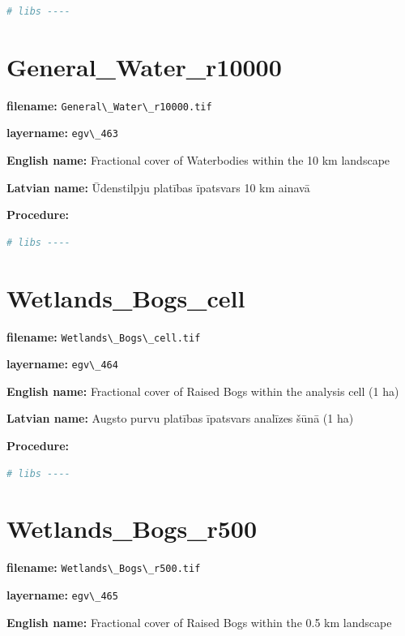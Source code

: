 \documentclass[
]{book}
\newcommand{\passthrough}[1]{#1}
\begin{document}
\begin{lstlisting}[language=R]
# libs ----
\end{lstlisting}

\section{General\_Water\_r10000}\label{ch06.463}

\textbf{filename:} \passthrough{\lstinline!General\_Water\_r10000.tif!}

\textbf{layername:} \passthrough{\lstinline!egv\_463!}

\textbf{English name:} Fractional cover of Waterbodies within the 10 km landscape

\textbf{Latvian name:} Ūdenstilpju platības īpatsvars 10 km ainavā

\textbf{Procedure:}

\begin{lstlisting}[language=R]
# libs ----
\end{lstlisting}

\section{Wetlands\_Bogs\_cell}\label{ch06.464}

\textbf{filename:} \passthrough{\lstinline!Wetlands\_Bogs\_cell.tif!}

\textbf{layername:} \passthrough{\lstinline!egv\_464!}

\textbf{English name:} Fractional cover of Raised Bogs within the analysis cell (1 ha)

\textbf{Latvian name:} Augsto purvu platības īpatsvars analīzes šūnā (1 ha)

\textbf{Procedure:}

\begin{lstlisting}[language=R]
# libs ----
\end{lstlisting}

\section{Wetlands\_Bogs\_r500}\label{ch06.465}

\textbf{filename:} \passthrough{\lstinline!Wetlands\_Bogs\_r500.tif!}

\textbf{layername:} \passthrough{\lstinline!egv\_465!}

\textbf{English name:} Fractional cover of Raised Bogs within the 0.5 km landscape
\end{document}
